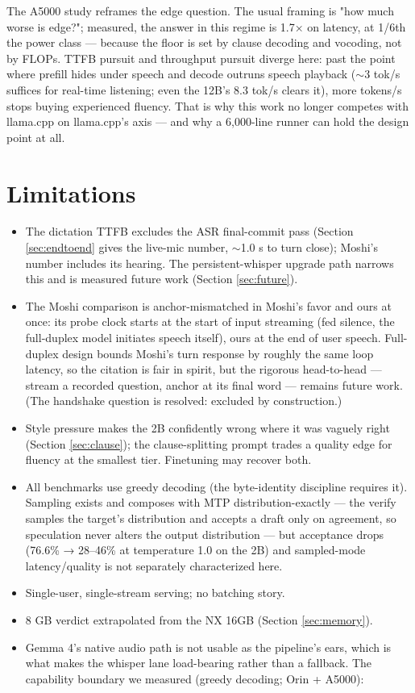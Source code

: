 \documentclass{article}
\begin{document}
The A5000 study reframes the edge question. The usual framing is "how much worse is edge?"; measured, the answer in this regime is 1.7× on latency, at 1/6th the power class — because the floor is set by clause decoding and vocoding, not by FLOPs. TTFB pursuit and throughput pursuit diverge here: past the point where prefill hides under speech and decode outruns speech playback ($\sim$3 tok/s suffices for real-time listening; even the 12B's 8.3 tok/s clears it), more tokens/s stops buying experienced fluency. That is why this work no longer competes with llama.cpp on llama.cpp's axis — and why a 6,000-line runner can hold the design point at all.

\section{Limitations}
\label{sec:limitations}

\begin{itemize}
	\item The dictation TTFB excludes the ASR final-commit pass (Section \ref{sec:endtoend} gives the live-mic number, $\sim$1.0 s to turn close); Moshi's number includes its hearing. The persistent-whisper upgrade path narrows this and is measured future work (Section \ref{sec:future}).
	\item The Moshi comparison is anchor-mismatched in Moshi's favor and ours at once: its probe clock starts at the start of input streaming (fed silence, the full-duplex model initiates speech itself), ours at the end of user speech. Full-duplex design bounds Moshi's turn response by roughly the same loop latency, so the citation is fair in spirit, but the rigorous head-to-head — stream a recorded question, anchor at its final word — remains future work. (The handshake question is resolved: excluded by construction.)
	\item Style pressure makes the 2B confidently wrong where it was vaguely right (Section \ref{sec:clause}); the clause-splitting prompt trades a quality edge for fluency at the smallest tier. Finetuning may recover both.
	\item All benchmarks use greedy decoding (the byte-identity discipline requires it). Sampling exists and composes with MTP distribution-exactly — the verify samples the target's distribution and accepts a draft only on agreement, so speculation never alters the output distribution — but acceptance drops (76.6\% → 28–46\% at temperature 1.0 on the 2B) and sampled-mode latency/quality is not separately characterized here.
	\item Single-user, single-stream serving; no batching story.
	\item 8 GB verdict extrapolated from the NX 16GB (Section \ref{sec:memory}).
	\item Gemma 4's native audio path is not usable as the pipeline's ears, which is what makes the whisper lane load-bearing rather than a fallback. The capability boundary we measured (greedy decoding; Orin + A5000):
\end{itemize}
\end{document}

